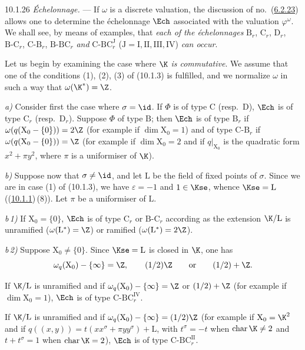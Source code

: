 \documentclass[12pt,a4paper,oneside,english]{smfart}
\makeatletter
\newcommand{\btanchor}[1]{\leavevmode\Hy@raisedlink{\hypertarget{bt:#1}{}}}
\newcommand{\btref}[1]{\hyperlink{bt:#1}{#1}}
\theoremstyle{definition}
\theoremstyle{bt}
\makeatother
\begin{document}
\num{10.1.26}\btanchor{10.1.26} \emph{Échelonnage.} --- If $\omega$ is a discrete valuation, the
discussion of no.~(\btref{6.2.23}) allows one to determine the échelonnage $\Ech$
associated with the valuation $\varphi^\omega$. We shall see, by means of
examples, that \emph{each of the échelonnages} $\mathrm{B}_r$, $\mathrm{C}_r$,
$\mathrm{D}_r$, $\mathrm{B}\text{-}\mathrm{C}_r$,
$\mathrm{C}\text{-}\mathrm{B}_r$, $\mathrm{B}\text{-}\mathrm{BC}_r$
\emph{and} $\mathrm{C}\text{-}\mathrm{BC}_r^{\mathrm{J}}$
($\mathrm{J}=\mathrm{I},\mathrm{II},\mathrm{III},\mathrm{IV}$)
\emph{can occur}.

Let us begin by examining the case where $\K$ \emph{is commutative}. We assume
that one of the conditions (1), (2), (3) of (10.1.3) is fulfilled, and we
normalize $\omega$ in such a way that $\omega(\K^{*})=\Z$.

\medskip
\emph{a)} Consider first the case where $\sigma=\id$. If $\Phi$ is of type
$\mathrm{C}$ (resp.\ $\mathrm{D}$), $\Ech$ is of type $\mathrm{C}_r$ (resp.\
$\mathrm{D}_r$). Suppose $\Phi$ of type $\mathrm{B}$; then $\Ech$ is of type
$\mathrm{B}_r$ if $\omega(q(\mathrm{X}_0-\{0\}))=2\Z$ (for example if
$\dim \mathrm{X}_0=1$) and of type $\mathrm{C}\text{-}\mathrm{B}_r$ if
$\omega(q(\mathrm{X}_0-\{0\}))=\Z$ (for example if $\dim \mathrm{X}_0=2$ and if
$q|_{\mathrm{X}_0}$ is the quadratic form $x^2+\pi y^2$, where $\pi$ is a
uniformiser of $\K$).

\medskip
\emph{b)} Suppose now that $\sigma\neq\id$, and let $\mathrm{L}$ be the field of
fixed points of $\sigma$. Since we are in case (1) of (10.1.3), we have
$\varepsilon=-1$ and $1\in\Kse$, whence $\Kse=\mathrm{L}$ ((\btref{10.1.1})\,(8)). Let
$\pi$ be a uniformiser of $\mathrm{L}$.

\smallskip
\emph{b\,1)} If $\mathrm{X}_0=\{0\}$, $\Ech$ is of type $\mathrm{C}_r$ or
$\mathrm{B}\text{-}\mathrm{C}_r$ according as the extension $\K/\mathrm{L}$ is
unramified ($\omega(\mathrm{L}^{*})=\Z$) or ramified
($\omega(\mathrm{L}^{*})=2\Z$).

\smallskip
\emph{b\,2)} Suppose $\mathrm{X}_0\neq\{0\}$. Since $\Kse=\mathrm{L}$ is closed
in $\K$, one has
\[
\omega_q(\mathrm{X}_0)-\{\infty\}=\Z,\qquad (1/2)\Z\qquad\text{or}\qquad (1/2)+\Z .
\]

If $\K/\mathrm{L}$ is unramified and if
$\omega_q(\mathrm{X}_0)-\{\infty\}=\Z$ or $(1/2)+\Z$ (for example if
$\dim \mathrm{X}_0=1$), $\Ech$ is of type
$\mathrm{C}\text{-}\mathrm{BC}_r^{\mathrm{IV}}$.

If $\K/\mathrm{L}$ is unramified and if
$\omega_q(\mathrm{X}_0)-\{\infty\}=(1/2)\Z$ (for example if
$\mathrm{X}_0=\K^2$ and if $q((x,y))=t(xx^\sigma+\pi yy^\sigma)+\mathrm{L}$,
with $t^\sigma=-t$ when $\operatorname{char}\K\neq 2$ and $t+t^\sigma=1$ when
$\operatorname{char}\K=2$), $\Ech$ is of type
$\mathrm{C}\text{-}\mathrm{BC}_r^{\mathrm{II}}$.
\end{document}
